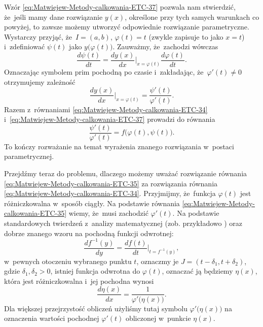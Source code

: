\documentclass[a4paper,11pt]{article}
\numberwithin{equation}{section}
\begin{document}
Wzór \eqref{eq:Matwiejew-Metody-calkowania-ETC-37}
pozwala nam stwierdzić, że~jeśli mamy dane rozwiązanie $y( x )$, określone
przy tych samych warunkach co powyżej, to zawsze możemy utworzyć odpowiednie
rozwiązanie parametryczne. Wystarczy przyjąć, że~$I = ( a, b )$,
$\varphi( t ) = t$ (zwykle zapisuje to jako $x = t$) i~zdefiniować $\psi( t )$ jako
$y\big( \varphi( t ) \big)$. Zauważmy, że~zachodzi wówczas
\begin{equation}
  \label{eq:Uwagi-do-konkrentych-stron-19}
  \frac{ d \psi( t ) }{ d t } =
  \frac{ d y( x ) }{ d x }\bigg|_{ x = \varphi( t ) }
  \frac{ d \varphi( t ) }{ d t }.
\end{equation}
Oznaczając symbolem prim pochodną po czasie i~zakładając,
że~$\varphi'( t ) \neq 0$ otrzymujemy zależność
\begin{equation}
  \label{eq:Uwagi-do-konkrentych-stron-20}
  \frac{ d y( x ) }{ d x }\bigg|_{ x = \varphi( t ) } =
  \frac{ \psi'( t ) }{ \varphi'( t ) }.
\end{equation}
Razem z~równaniami \eqref{eq:Matwiejew-Metody-calkowania-ETC-34}
i~\eqref{eq:Matwiejew-Metody-calkowania-ETC-37} prowadzi do równania
\begin{equation}
  \label{eq:Uwagi-do-konkrentych-stron-21}
  \frac{ \psi'( t ) }{ \varphi'( t ) } =
  f\big( \varphi( t ), \psi( t ) \big).
\end{equation}
To kończy rozważanie na temat wyrażenia znanego rozwiązania w~postaci
parametrycznej.

Przejdźmy teraz do problemu, dlaczego możemy uważać rozwiązanie równania
\eqref{eq:Matwiejew-Metody-calkowania-ETC-35} za rozwiązania równania
\eqref{eq:Matwiejew-Metody-calkowania-ETC-34}. Przyjmijmy, że~funkcja
$\varphi( t )$ jest różniczkowalna w~sposób ciągły. Na podstawie równania
\eqref{eq:Matwiejew-Metody-calkowania-ETC-35} wiemy, że~musi zachodzić
$\varphi'( t )$. Na podstawie standardowych twierdzeń z~analizy matematycznej
(zob. przykładowo \cite{FichtenholzRachunekRozniczkowyETCVolI2005}) oraz
dobrze znanego wzoru na pochodną funkcji odwrotnej:
\begin{equation}
  \label{eq:Uwagi-do-konkrentych-stron-22}
  \frac{ d f^{ -1 }( y ) }{ dy } =
  \frac{ d f( t ) }{ d t }\bigg|_{ t = f^{ -1 }( y ) },
\end{equation}
w~pewnych otoczeniu wybranego punktu $t$, oznaczmy je
$J = ( t - \delta_{ 1 }, t + \delta_{ 2 } )$, gdzie $\delta_{ 1 }, \delta_{ 2 } > 0$, istniej
funkcja odwrotna do $\varphi( t )$, oznaczać ją będziemy $\eta( x )$, która jest
różniczkowalna i~jej pochodna wynosi
\begin{equation}
  \label{eq:Uwagi-do-konkrentych-stron-23}
  \frac{ d \eta( x ) }{ d x } =
  \frac{ 1 }{ \varphi'\big( \eta( x ) \big) }.
\end{equation}
Dla większej przejrzystość obliczeń użyliśmy tutaj symbolu
$\varphi'\big( \eta( x ) \big)$ na oznaczenia wartości pochodnej $\varphi'( t )$ obliczonej
w~punkcie $\eta( x )$.
\end{document}
